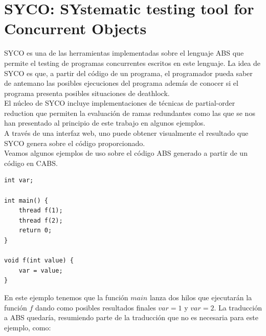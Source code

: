\chapter{SYCO: SYstematic testing tool for Concurrent Objects}

SYCO es una de las herramientas implementadas sobre el lenguaje ABS que permite el testing de programas concurrentes escritos en este lenguaje. La idea de SYCO es que, a partir del código de un programa, el programador pueda saber de antemano las posibles ejecuciones del programa además de conocer si el programa presenta posibles situaciones de deathlock.\\

El núcleo de SYCO incluye implementaciones de técnicas de partial-order reduction que permiten la evaluación de ramas redundantes como las que se nos han presentado al principio de este trabajo en algunos ejemplos.\\

A través de una interfaz web, uno puede obtener visualmente el resultado que SYCO genera sobre el código proporcionado.\\

Veamos algunos ejemplos de uso sobre el código ABS generado a partir de un código en CABS.\\

\begin{lstlisting}
int var;

int main() {
    thread f(1);
    thread f(2);
    return 0;
}

void f(int value) {
    var = value;
}
\end{lstlisting}

En este ejemplo tenemos que la función $main$ lanza dos hilos que ejecutarán la función $f$ dando como posibles resultados finales $var = 1$ y $var = 2$. La traducción a ABS quedaría, resumiendo parte de la traducción que no es necesaria para este ejemplo, como:

